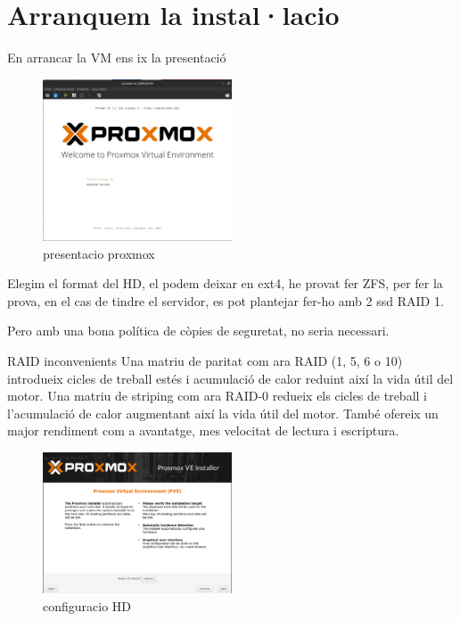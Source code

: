 \documentclass[
  10pt,
]{krantz}
\begin{document}
\hypertarget{arranquem-la-installacio}{%
\section{Arranquem la instal·lacio}\label{arranquem-la-installacio}}

En arrancar la VM ens ix la presentació

\begin{figure}
\centering
\includegraphics[width=0.5\textwidth,height=\textheight]{imatges/proxmox/proxmox_inst6.png}
\caption{presentacio proxmox}
\end{figure}

Elegim el format del HD, el podem deixar en ext4, he provat fer ZFS, per fer la prova, en el cas de tindre el servidor, es pot plantejar fer-ho amb 2 ssd RAID 1.

Pero amb una bona política de còpies de seguretat, no seria necessari.

\begin{rmdinfo}{RAID inconvenients}
Una matriu de paritat com ara RAID (1, 5, 6 o 10) introdueix cicles de treball estés i acumulació de calor reduint així la vida útil del motor. Una matriu de striping com ara RAID-0 redueix els cicles de treball i l'acumulació de calor augmentant així la vida útil del motor. També ofereix un major rendiment com a avantatge, mes velocitat de lectura i escriptura.

\end{rmdinfo}

\begin{figure}
\centering
\includegraphics[width=0.5\textwidth,height=\textheight]{imatges/proxmox/proxmox_ins8.png}
\caption{configuracio HD}
\end{figure}
\end{document}
